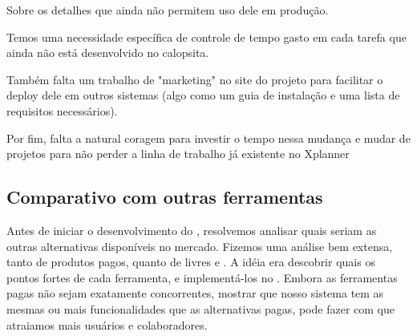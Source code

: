 Sobre os detalhes que ainda não permitem uso dele em produção.

Temos uma necessidade específica de controle de tempo gasto em cada tarefa que ainda não está desenvolvido no calopsita.

Também falta um trabalho de "marketing" no site do projeto para facilitar o deploy dele em outros sistemas (algo como um guia de instalação e uma lista de requisitos necessários).

Por fim, falta a natural coragem para investir o tempo nessa mudança e mudar de projetos para não perder a linha de trabalho já existente no Xplanner




\subsection{Comparativo com outras ferramentas}

Antes de iniciar o desenvolvimento do \calopsita{}, resolvemos analisar quais seriam as outras alternativas disponíveis no mercado. Fizemos uma análise bem extensa, tanto de produtos pagos, quanto de livres e \opensource{}. A idéia era descobrir quais os pontos fortes de cada ferramenta, e implementá-los no \calopsita{}. Embora as ferramentas pagas não sejam exatamente concorrentes, mostrar que nosso sistema tem as mesmas ou mais funcionalidades que as alternativas pagas, pode fazer com que atraiamos mais usuários e colaboradores.

